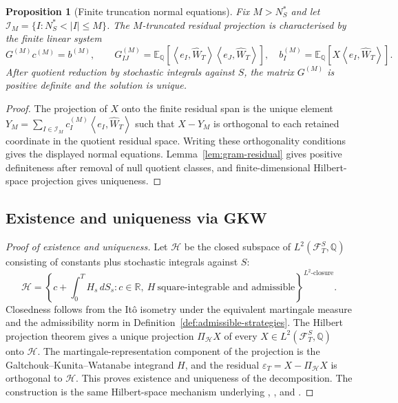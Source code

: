 \documentclass[11pt,oneside]{article}
\theoremstyle{plain}
\newtheorem{proposition}[theorem]{Proposition}
\theoremstyle{definition}
\theoremstyle{remark}
\newcommand{\R}{\mathbb{R}}
\newcommand{\E}{\mathbb{E}}
\newcommand{\Q}{\mathbb{Q}}
\newcommand{\cW}{\widehat W}
\newcommand{\FS}{\mathcal F^S}
\newcommand{\inner}[2]{\left\langle #1,#2\right\rangle}
\begin{document}
\begin{proposition}[Finite truncation normal equations]\label{prop:finite-normal}
Fix $M>N_S^\ast$ and let $\mathcal I_M=\{I:N_S^\ast<|I|\leq M\}$. The $M$-truncated residual projection is characterised by the finite linear system
\[
G^{(M)}c^{(M)}=b^{(M)},
\qquad
G^{(M)}_{IJ}=\E_\Q[\inner{e_I}{\cW_T}\inner{e_J}{\cW_T}],
\quad b^{(M)}_I=\E_\Q[X\inner{e_I}{\cW_T}].
\]
After quotient reduction by stochastic integrals against $S$, the matrix $G^{(M)}$ is positive definite and the solution is unique.
\end{proposition}

\begin{proof}
The projection of $X$ onto the finite residual span is the unique element $Y_M=\sum_{I\in\mathcal I_M}c_I^{(M)}\inner{e_I}{\cW_T}$ such that $X-Y_M$ is orthogonal to each retained coordinate in the quotient residual space. Writing these orthogonality conditions gives the displayed normal equations. Lemma~\ref{lem:gram-residual} gives positive definiteness after removal of null quotient classes, and finite-dimensional Hilbert-space projection gives uniqueness.
\end{proof}

\subsection{Existence and uniqueness via GKW}

\begin{proof}[Proof of existence and uniqueness]
Let $\mathcal H$ be the closed subspace of $L^2(\FS_T,\Q)$ consisting of constants plus stochastic integrals against $S$:
\[
\mathcal H=\left\{c+\int_0^T H_s\,dS_s: c\in\R,\ H\ \text{square-integrable and admissible}\right\}^{L^2\text{-closure}}.
\]
Closedness follows from the It\^o isometry under the equivalent martingale measure and the admissibility norm in Definition~\ref{def:admissible-strategies}. The Hilbert projection theorem gives a unique projection $\Pi_{\mathcal H}X$ of every $X\in L^2(\FS_T,\Q)$ onto $\mathcal H$. The martingale-representation component of the projection is the Galtchouk--Kunita--Watanabe integrand $H$, and the residual $\varepsilon_T=X-\Pi_{\mathcal H}X$ is orthogonal to $\mathcal H$. This proves existence and uniqueness of the decomposition. The construction is the same Hilbert-space mechanism underlying \citet{FoellmerSchweizer1991}, \citet{KunitaWatanabe1967}, and \citet{Schweizer2001}.
\end{proof}
\end{document}
